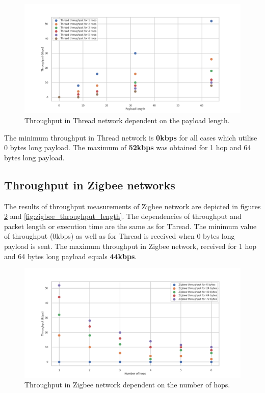 \begin{figure}[H]
    \centering
    \includegraphics[scale=0.45]{images/Thread_Throughput_vs_length.png}
    \caption{Throughput in Thread network dependent on the payload length. }
    \label{fig:thread_throughput_length}
\end{figure}

The minimum throughput in Thread network is \textbf{0kbps} for all cases
which utilise 0 bytes long payload. The maximum of \textbf{52kbps} was obtained
for 1 hop and 64 bytes long payload.


\subsection{Throughput in Zigbee networks}

The results of throughput measurements of Zigbee network are depicted
in figures \ref{fig:zigbee_throughput_all} and \ref{fig:zigbee_throughput_length}. The dependencies of
throughput and packet length or execution time are the same as
for Thread. The minimum value of throughput (0kbps) as well as for
Thread is received when 0 bytes long payload is sent. The maximum
throughput in Zigbee network, received for 1 hop and 64 bytes long payload equals \textbf{44kbps}.


\begin{figure}[H]
    \centering
    \includegraphics[scale=0.45]{images/Zigbee_Throughput_all.png}
    \caption{Throughput in Zigbee network dependent on the number of hops.}
    \label{fig:zigbee_throughput_all}
\end{figure}


